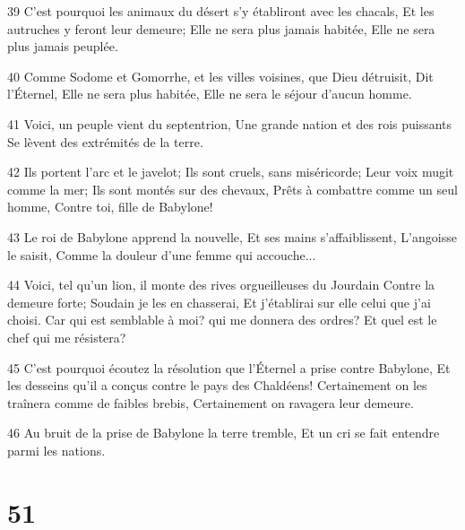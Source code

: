 \par 39 C'est pourquoi les animaux du désert s'y établiront avec les chacals, Et les autruches y feront leur demeure; Elle ne sera plus jamais habitée, Elle ne sera plus jamais peuplée.
\par 40 Comme Sodome et Gomorrhe, et les villes voisines, que Dieu détruisit, Dit l'Éternel, Elle ne sera plus habitée, Elle ne sera le séjour d'aucun homme.
\par 41 Voici, un peuple vient du septentrion, Une grande nation et des rois puissants Se lèvent des extrémités de la terre.
\par 42 Ils portent l'arc et le javelot; Ils sont cruels, sans miséricorde; Leur voix mugit comme la mer; Ils sont montés sur des chevaux, Prêts à combattre comme un seul homme, Contre toi, fille de Babylone!
\par 43 Le roi de Babylone apprend la nouvelle, Et ses mains s'affaiblissent, L'angoisse le saisit, Comme la douleur d'une femme qui accouche...
\par 44 Voici, tel qu'un lion, il monte des rives orgueilleuses du Jourdain Contre la demeure forte; Soudain je les en chasserai, Et j'établirai sur elle celui que j'ai choisi. Car qui est semblable à moi? qui me donnera des ordres? Et quel est le chef qui me résistera?
\par 45 C'est pourquoi écoutez la résolution que l'Éternel a prise contre Babylone, Et les desseins qu'il a conçus contre le pays des Chaldéens! Certainement on les traînera comme de faibles brebis, Certainement on ravagera leur demeure.
\par 46 Au bruit de la prise de Babylone la terre tremble, Et un cri se fait entendre parmi les nations.

\chapter{51}

